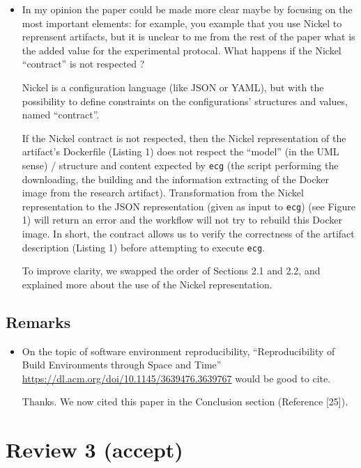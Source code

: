 \documentclass[%
	11pt,
	final,
]{article}
\begin{document}
\begin{itemize}
\item In my opinion the paper could be made more clear maybe by focusing on the most important elements: for example, you example that you use Nickel to reprensent artifacts, but it is unclear to me from the rest of the paper what is the added value for the experimental protocal. What happens if the Nickel ``contract'' is not respected ?
\begin{review-answer}
  Nickel is a configuration language (like JSON or YAML), but with the possibility to define constraints on the configurations' structures and values, named ``contract''.

  If the Nickel contract is not respected, then the Nickel representation of the artifact's Dockerfile (Listing 1) does not respect the ``model'' (in the UML sense) / structure and content expected by \texttt{ecg} (the script performing the downloading, the building and the information extracting of the Docker image from the research artifact).
  Transformation from the Nickel representation to the JSON representation (given as input to \texttt{ecg}) (see Figure 1) will return an error and the workflow will not try to rebuild this Docker image.
  In short, the contract allows us to verify the correctness of the artifact description (Listing 1) before attempting to execute \texttt{ecg}.

  To improve clarity, we swapped the order of Sections 2.1 and 2.2, and explained more about the use of the Nickel representation.
\end{review-answer}
\end{itemize}

\subsection{Remarks}

\begin{itemize}
\item On the topic of software environment reproducibility, ``Reproducibility of Build Environments through Space and Time'' \url{https://dl.acm.org/doi/10.1145/3639476.3639767} would be good to cite.
  \begin{review-answer}
    Thanks. We now cited this paper in the Conclusion section (Reference [25]).
  \end{review-answer}
\end{itemize}


\section{Review 3 (accept)}
\end{document}
